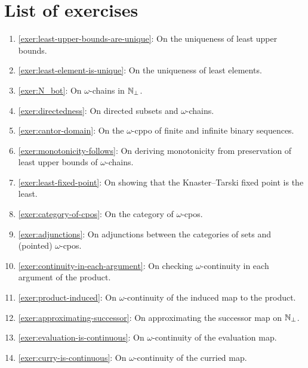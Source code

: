 \section{List of exercises}
\begin{enumerate}
\item \cref{exer:least-upper-bounds-are-unique}: On the uniqueness of least upper bounds.
\item \cref{exer:least-element-is-unique}: On the uniqueness of least elements.
\item \cref{exer:N_bot}: On \(\omega\)-chains in \(\mathbb N_\bot\).
\item \cref{exer:directedness}: On directed subsets and \(\omega\)-chains.
\item \cref{exer:cantor-domain}: On the \(\omega\)-cppo of finite and infinite
  binary sequences.
\item \cref{exer:monotonicity-follows}: On deriving monotonicity from preservation of
  least upper bounds of \(\omega\)-chains.
\item \cref{exer:least-fixed-point}: On showing that the Knaster--Tarski fixed point
  is the least.
\item \cref{exer:category-of-cpos}: On the category of \(\omega\)-cpos.
\item \cref{exer:adjunctions}: On adjunctions between the categories of sets and
  (pointed) \(\omega\)-cpos.
\item \cref{exer:continuity-in-each-argument}: On checking \(\omega\)-continuity
  in each argument of the product.
\item \cref{exer:product-induced}: On \(\omega\)-continuity of the induced map
  to the product.
\item \cref{exer:approximating-successor}: On approximating the successor map on
  \(\mathbb N_\bot\).
\item \cref{exer:evaluation-is-continuous}: On \(\omega\)-continuity of the evaluation map.
\item \cref{exer:curry-is-continuous}: On \(\omega\)-continuity of the curried map.
\end{enumerate}

